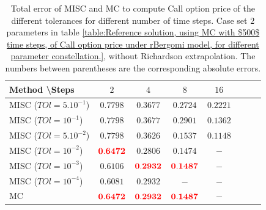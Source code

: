 \documentclass[11pt]{article}
\begin{document}
\begin{table}[h!]
	\centering
	\begin{tabular}{l*{6}{c}r}
		Method \textbackslash  Steps            & $2$ & $4$ & $8$ & $16$  \\
		\hline
		MISC ($TOl=5.10^{-1}$)  & $\mathbf{0.7798}$ & $\mathbf{0.3677}$ & $\mathbf{ 0.2724}$ & $\mathbf{ 0.2221}$  \\
		MISC ($TOl=10^{-1}$)  & $\mathbf{ 0.7798
		}$ & $\mathbf{ 0.3677
	}$ & $\mathbf{ 0.2901
}$ & $\mathbf{0.1362}$  \\
		MISC ($TOl=5.10^{-2}$)  &$\mathbf{0.7798
		}$ & $\mathbf{   0.3626
	}$ & $\mathbf{  0.1537}$ & $\mathbf{ 0.1148}$  \\
		MISC ($TOl=10^{-2}$)  & $\mathbf{ {\color{red}0.6472}}$ & $\mathbf{0.2806}$ & $\mathbf{ 0.1474}$ & $\mathbf{-}$  \\
	MISC ($TOl=10^{-3}$)        & $\mathbf{0.6106}$  &  $\mathbf{{\color{red}0.2932}}$ &  $\mathbf{{\color{red}0.1487}}$ &  $-$ \\
		MISC ($TOl=10^{-4}$)        & $\mathbf{0.6081}$  & $\mathbf{0.2932}$  &  $-$ &  $-$ \\
	\hline
	MC    & $\mathbf{{\color{red}0.6472}}$  & $\mathbf{{\color{red}0.2932}
	}$  &$\mathbf{{\color{red}0.1487}}$  & $\mathbf{-}$  \\	
%			
		\hline
	\end{tabular}
	\caption{Total error of MISC and MC to compute Call option price of the different tolerances for different number of time steps. Case  set $2$ parameters in table \ref{table:Reference solution, using MC with $500$ time steps, of Call option price under rBergomi model, for different parameter constellation.}, without Richardson extrapolation. The numbers between parentheses are the corresponding absolute errors.}
	\label{Total error of MISC and MC to compute Call option price of the different tolerances for different number of time steps. Case $K=1$, $H=0.07$, without Richardson extrapolation. The numbers between parentheses are the corresponding absolute errors.}
\end{table}
\end{document}
